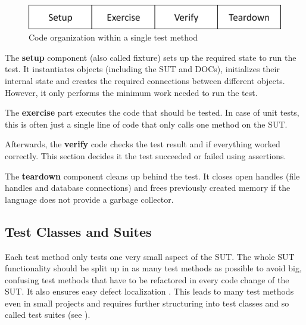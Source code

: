         \begin{figure}[hbtp]
            \centering
            \includegraphics[width=0.95\columnwidth]{img/organisation_test.png}
            \caption{Code organization within a single test method }
            \label{fig:TestMethodOrganization}
        \end{figure}

        The \textbf{setup} component (also called fixture) sets up the required state to run the test. It instantiates objects (including the SUT and DOCs),
        initializes their internal state and creates
        the required connections between different objects. However, it only performs the minimum work needed to run the test.

        The \textbf{exercise} part executes the code that should be tested. In case of unit tests, this is often just a single line of code that only calls one method on the SUT.

        Afterwards, the \textbf{verify} code checks the test result and if everything worked correctly. This section decides it the test succeeded or failed using assertions.

        The \textbf{teardown} component cleans up behind the test. It closes open handles (file handles and database connections)
        and frees previously created memory if the language does not provide a garbage collector.

    \subsection{Test Classes and Suites} \label{subsec:TestclassesAndSuites}
        Each test method only tests one very small aspect of the SUT. The whole SUT functionality should be split up in as many test methods as possible to avoid big,
        confusing test methods that have to be refactored in every code change of the SUT. It also ensures easy defect localization \cite[p.~154]{Meszaros:2006:XTP:1076526}.
        This leads to many test methods even in small projects and requires further structuring into test classes and so called test suites (see ).

